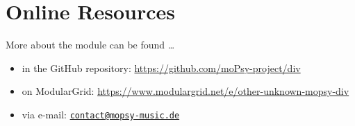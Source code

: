 \documentclass[a4paper,
               11pt,
               parskip=half,
               headinclude,
               titlepage=false]{scrartcl}
\begin{document}
\section*{Online Resources}

More about the module can be found …
\begin{itemize}[noitemsep]
 \item in the GitHub repository: \url{https://github.com/moPsy-project/div}
 \item on ModularGrid: \url{https://www.modulargrid.net/e/other-unknown-mopsy-div}
 \item via e-mail: \href{mailto:contact@mopsy-music.de}{\texttt{contact@mopsy-music.de}}
\end{itemize}
\end{document}
